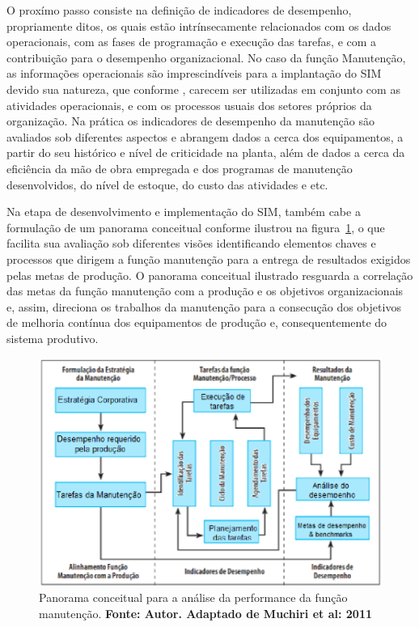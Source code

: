 O proxímo passo consiste na definição de indicadores de desempenho, propriamente ditos, os quais estão intrínsecamente relacionados com os dados operacionais, com as fases de programação e execução das tarefas, e com a contribuição para o desempenho organizacional. No caso da função Manutenção, as informações operacionais são imprescindíveis para a implantação do SIM devido sua natureza, que conforme \cite{martorell1999}, carecem ser utilizadas em conjunto com as atividades operacionais, e com os processos usuais dos setores próprios da organização. Na prática os indicadores de desempenho da manutenção são avaliados sob diferentes aspectos e abrangem dados a cerca dos equipamentos, a partir do seu histórico e nível de criticidade na planta, além de dados a cerca da eficiência da mão de obra empregada e dos programas de manutenção desenvolvidos, do nível de estoque, do custo das atividades e etc.

Na etapa de desenvolvimento e implementação do SIM, também cabe a formulação de um panorama conceitual conforme ilustrou \cite{muchiri2011development} na figura~\ref{Desempenho da funcao manutencao}, o que facilita sua avaliação sob diferentes visões identificando elementos chaves e processos que dirigem a função manutenção para a entrega de resultados exigidos pelas metas de produção. O panorama conceitual ilustrado resguarda a correlação das metas da função manutenção com a produção e os objetivos organizacionais e, assim, direciona os trabalhos da manutenção para a consecução dos objetivos de melhoria contínua dos equipamentos de produção e, consequentemente do sistema produtivo.

\graphicspath{{figuras/}}
\begin{figure}[H]
\centering
\includegraphics[width=1\textwidth]{desempenho_da_funcao_manutencao.eps}
\caption{Panorama conceitual para a análise da performance da função manutenção. \textbf{Fonte: Autor. Adaptado de Muchiri et al: 2011}}
\label{Desempenho da funcao manutencao}
\end{figure}

